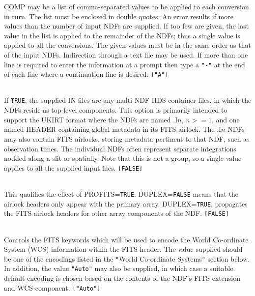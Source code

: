 \documentclass[twoside,11pt]{article}
\newcommand{\htmlref}[2]{#1}
\newcommand{\sstsubsection}[1]{ \item[{#1}] \mbox{} \\}
\newcommand{\sstsubsection}[1]{\item[{#1}]}
\begin{document}
{{{         COMP may be a list of comma-separated values to be applied to
         each conversion in turn.  The list must be enclosed in double quotes.
         An error results if more values than
         the number of input NDFs are supplied.  If too few are given,
         the last value in the list is applied to the remainder of the
         NDFs; thus a single value is applied to all the conversions.
         The given values must be in the same order as that of the
         input NDFs.  Indirection through a text file may be used.  If
         more than one line is required to enter the information at a prompt
         then type a \texttt{"-"} at the end of each line where a continuation 
         line is desired.  \texttt{["A"]}
      }
      \sstsubsection{
         CONTAINER = \_LOGICAL (Read)
      }{
         If \texttt{TRUE}, the supplied IN files are any multi-NDF HDS 
         container files, in which the NDFs reside as top-level 
         components.  This option is primarily intended to support 
         the UKIRT format where the NDFs are named .I$n$, 
         $n >=1$, and one named HEADER containing global metadata in 
         its FITS airlock.  The .I$n$ NDFs
         may also contain FITS airlocks, storing metadata pertinent to
         that NDF, such as observation times.  The individual NDFs often
         represent separate integrations nodded along a slit or
         spatially.  Note that this is not a group, so a single value
         applies to all the supplied input files.  \texttt{[FALSE]}
      }
      \sstsubsection{
         DUPLEX = \_LOGICAL (Read)
      }{
         This qualifies the effect of PROFITS=\texttt{TRUE}.  
          DUPLEX=\texttt{FALSE} means that the airlock headers only appear
          with the primary array.  DUPLEX=\texttt{TRUE}, propagates the 
          FITS airlock headers for other array components of the NDF. 
          \texttt{[FALSE]}
      }
      \sstsubsection{
         ENCODING = LITERAL (Read)
      }{
         Controls the FITS keywords which will be used to encode the 
         World Co-ordinate System (WCS) information within the FITS 
         header. The value supplied should be one of the encodings listed
         in the 
         \htmlref{\texttt{"}World Co-ordinate Systems\texttt{"}}
         {world_coordinate_systems}
         section below. In addition, 
         the value \texttt{"Auto"} may also be supplied, in which case a suitable
         default encoding is chosen based on the contents of the NDF's FITS
         extension and WCS component.  \texttt{["Auto"]}
      }
      \sstsubsection{
}}}
\end{document}
